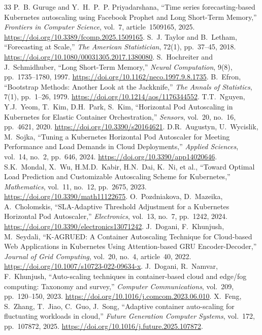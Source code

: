 \documentclass[10pt,twocolumn,a4paper]{article}
\begin{document}
\begin{thebibliography}{33}
 P.~B. Guruge and Y.~H.~P.~P. Priyadarshana, ``Time series forecasting-based Kubernetes autoscaling using Facebook Prophet and Long Short-Term Memory,'' \emph{Frontiers in Computer Science}, vol.~7, article~1509165, 2025. \url{https://doi.org/10.3389/fcomp.2025.1509165}.
 S.~J. Taylor and B.~Letham, ``Forecasting at Scale,'' \emph{The American Statistician}, 72(1), pp.~37--45, 2018. \url{https://doi.org/10.1080/00031305.2017.1380080}.
 S.~Hochreiter and J.~Schmidhuber, ``Long Short-Term Memory,'' \emph{Neural Computation}, 9(8), pp.~1735--1780, 1997. \url{https://doi.org/10.1162/neco.1997.9.8.1735}.
 B.~Efron, ``Bootstrap Methods: Another Look at the Jackknife,'' \emph{The Annals of Statistics}, 7(1), pp.~1--26, 1979. \url{https://doi.org/10.1214/aos/1176344552}.
 T.T.~Nguyen, Y.J.~Yeom, T.~Kim, D.H.~Park, S.~Kim, ``Horizontal Pod Autoscaling in Kubernetes for Elastic Container Orchestration,'' \emph{Sensors}, vol.~20, no.~16, pp.~4621, 2020. \url{https://doi.org/10.3390/s20164621}.
 D.R.~Augustyn, U.~Wycislik, M.~Sojka, ``Tuning a Kubernetes Horizontal Pod Autoscaler for Meeting Performance and Load Demands in Cloud Deployments,'' \emph{Applied Sciences}, vol.~14, no.~2, pp.~646, 2024. \url{https://doi.org/10.3390/app14020646}.
 S.K.~Mondal, X.~Wu, H.M.D.~Kabir, H.N.~Dai, K.~Ni, et al., ``Toward Optimal Load Prediction and Customizable Autoscaling Scheme for Kubernetes,'' \emph{Mathematics}, vol.~11, no.~12, pp.~2675, 2023. \url{https://doi.org/10.3390/math11122675}.
 O.~Pozdniakova, D.~Mazeika, A.~Cholomskis, ``SLA-Adaptive Threshold Adjustment for a Kubernetes Horizontal Pod Autoscaler,'' \emph{Electronics}, vol.~13, no.~7, pp.~1242, 2024. \url{https://doi.org/10.3390/electronics13071242}.
 J.~Dogani, F.~Khunjush, M.~Seydali, ``K-AGRUED: A Container Autoscaling Technique for Cloud-based Web Applications in Kubernetes Using Attention-based GRU Encoder-Decoder,'' \emph{Journal of Grid Computing}, vol.~20, no.~4, article~40, 2022. \url{https://doi.org/10.1007/s10723-022-09634-x}.
 J.~Dogani, R.~Namvar, F.~Khunjush, ``Auto-scaling techniques in container-based cloud and edge/fog computing: Taxonomy and survey,'' \emph{Computer Communications}, vol.~209, pp.~120--150, 2023. \url{https://doi.org/10.1016/j.comcom.2023.06.010}.
 X.~Feng, S.~Zhang, T.~Jiao, C.~Guo, J.~Song, ``Adaptive container auto-scaling for fluctuating workloads in cloud,'' \emph{Future Generation Computer Systems}, vol.~172, pp.~107872, 2025. \url{https://doi.org/10.1016/j.future.2025.107872}.

\end{thebibliography}
\end{document}
